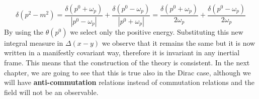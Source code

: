 \documentclass[../main.tex]{subfiles}
\begin{document}
\[
\delta(p^2-m^2)=\frac{\delta(p^0+\omega_p)}{|p^0-\omega_p|}+\frac{\delta(p^0-\omega_p)}{|p^0+\omega_p|}=\frac{\delta(p^0+\omega_p)}{2\omega_p}+\frac{\delta(p^0-\omega_p)}{2\omega_p}
\]
By using the $\theta(p^0)$ we select only the positive energy. Substituting this new integral measure in $\Delta(x-y)$ we observe that it remains the same but it is now written in a manifestly covariant way, therefore it is invariant in any inertial frame. This means that the construction of the theory is consistent. In the next chapter, we are going to see that this is true also in the Dirac case, although we will have \textbf{anti-commutation} relations instead of commutation relations and the field will not be an observable.
\end{document}
